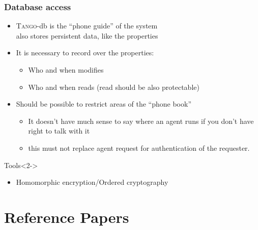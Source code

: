 \documentclass{beamer}
\newcommand{\tango}{\textsc{Tango}}
\begin{document}
\begin{frame}
\frametitle{Database access}
    \begin{itemize}
        \item \tango-db is the ``phone guide'' of the system\\also stores persistent data, like the properties
        \item It is necessary to record over the properties:
        \begin{itemize}
            \item Who and when modifies
            \item Who and when reads (read should be also protectable)
        \end{itemize}
        \item Should be possible to restrict areas of the ``phone book''
        \begin{itemize}
            \item It doesn't have much sense to say where an agent runs if you don't have right to talk with it
            \item this must not replace agent request for authentication of the requester.
        \end{itemize}
    \end{itemize}
    \begin{alertblock}{Tools}<2->
        \begin{itemize}
            \item Homomorphic encryption/Ordered cryptography
        \end{itemize}
    \end{alertblock}
\end{frame}

\section{Reference Papers}
\end{document}
